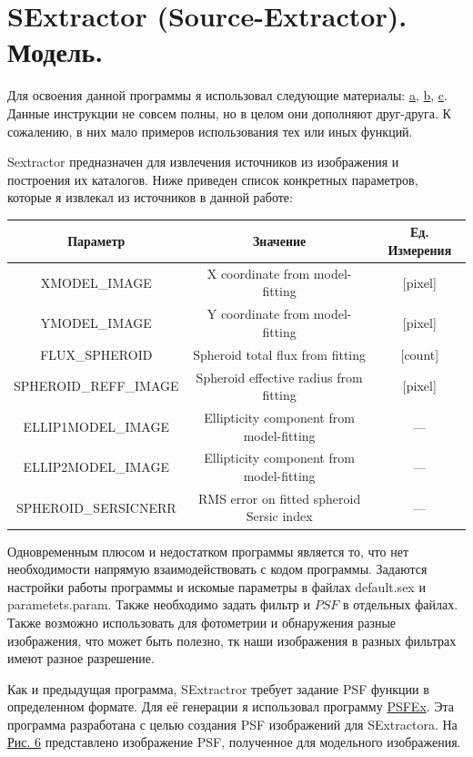 \documentclass[12pt,a4paper]{article}
\begin{document}
\section{SExtractor (Source-Extractor). Модель.}

Для освоения данной программы я использовал следующие материалы: \hyperref[a]{a}, \hyperref[b]{b}, \hyperref[c]{c}. Данные инструкции не совсем полны, но в целом они дополняют друг-друга. К сожалению, в них мало примеров использования тех или иных функций.
 
Sextractor предназначен для извлечения источников из изображения и построения их каталогов. Ниже приведен список конкретных параметров, которые я извлекал из источников в данной работе:

\begin{table}[h]
    \begin{tabular}{|c|c|c|}
				\hline 
                 Параметр & Значение & Ед. Измерения\\
                \hline
                 XMODEL\_IMAGE  & X coordinate from model-fitting & [pixel] \\
                 YMODEL\_IMAGE  & Y coordinate from model-fitting & [pixel] \\
                 FLUX\_SPHEROID & Spheroid total flux from fitting  &[count]\\
                 SPHEROID\_REFF\_IMAGE & Spheroid effective radius from fitting & [pixel]\\
                 ELLIP1MODEL\_IMAGE & Ellipticity component from model-fitting & --- \\                
                 ELLIP2MODEL\_IMAGE & Ellipticity component from model-fitting & --- \\
                 SPHEROID\_SERSICNERR & RMS error on fitted spheroid Sersic index & --- \\
                 \hline
	\end{tabular} 
\end{table}


Одновременным плюсом и недостатком программы является то, что нет необходимости напрямую взаимодействовать с кодом программы. Задаются настройки работы программы и искомые параметры в файлах default.sex  и parametets.param. Также необходимо задать фильтр и $PSF$ в отдельных файлах. Также возможно использовать для фотометрии и обнаружения разные изображения, что может быть полезно, тк наши изображения в разных фильтрах имеют разное разрешение.

Как и предыдущая программа, SExtractror требует задание PSF функции в определенном формате. Для её генерации я использовал программу \href{https://github.com/astromatic/psfex}{PSFEx}. Эта программа разработана с целью создания PSF изображений для SExtractora. На \hyperref[pic6]{Рис. 6} представлено изображение PSF, полученное для модельного изображения. 
\end{document}
